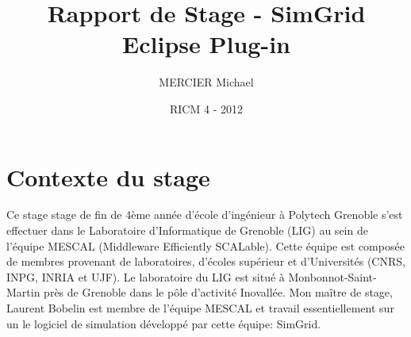 \documentclass{article}
\title{Rapport de Stage - SimGrid Eclipse Plug-in}
\author{MERCIER Michael}
\date{RICM 4 - 2012}
\makeatletter
\def\thetitle{\@title}
\def\theauthor{\@author}
\def\thedate{\@date}
\makeatother
\begin{document}
\begin{titlepage}
\centering

\vfill

{\Huge\bfseries \thetitle}

\vskip 1cm

{\Large \theauthor}

\vskip 0.5cm

\thedate

\vfill
\end{titlepage}


\tableofcontents

\newpage
\section{Contexte du stage}
	 Ce stage stage de fin de 4ème année d'école d'ingénieur à Polytech Grenoble s'est effectuer dans le Laboratoire d'Informatique de Grenoble (LIG) au sein de l'équipe MESCAL (Middleware Efficiently SCALable). Cette équipe est composée de membres provenant de laboratoires, d'écoles supérieur et d'Universités (CNRS, INPG, INRIA et UJF). Le laboratoire du LIG est situé à Monbonnot-Saint-Martin près de Grenoble dans le pôle d'activité Inovallée.
	 Mon maître de stage, Laurent Bobelin est membre de l'équipe MESCAL et travail essentiellement sur un le logiciel de simulation développé par cette équipe: SimGrid.
\end{document}
